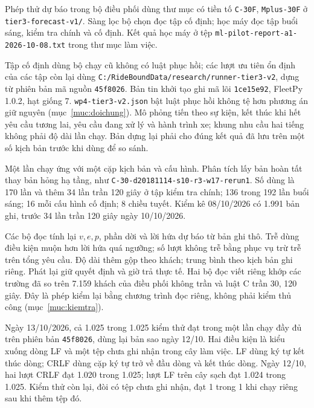 Phép thử dự báo trong bộ điều phối dùng thư mục có tiền tố \texttt{C-30F}, \texttt{Mplus-30F} ở \nolinkurl{tier3-forecast-v1/}. Sàng lọc bộ chọn đọc tập cố định; học máy đọc tập buổi sáng, kiểm tra chính và cố định. Kết quả học máy ở tệp \nolinkurl{ml-pilot-report-a1-2026-10-08.txt} trong thư mục làm việc.

Tập cố định dùng bộ chạy cũ không có luật phục hồi; các lượt ưu tiên ổn định của các tập còn lại dùng \nolinkurl{C:/RideBoundData/research/runner-tier3-v2}, dựng từ phiên bản mã nguồn \texttt{45f8026}. Bản tin khởi tạo ghi mã lõi \texttt{1ce15e92}, FleetPy 1.0.2, hạt giống 7. \nolinkurl{wp4-tier3-v2.json} bật luật phục hồi không tệ hơn phương án giữ nguyên (mục~\ref{muc:doichung}). Mô phỏng tiến theo sự kiện, kết thúc khi hết yêu cầu tương lai, yêu cầu đang xử lý và hành trình xe; khung nhu cầu hai tiếng không phải độ dài lần chạy. Bản dựng lại phải cho đúng kết quả đã lưu trên một số kịch bản trước khi dùng để so sánh.

Một lần chạy ứng với một cặp kịch bản và cấu hình. Phân tích lấy bản hoàn tất thay bản hỏng hạ tầng, như \nolinkurl{C-30-d20181114-s10-r3-w17-rerun1}. Số dùng là 170 lần và thêm 34 lần trần 120 giây ở tập kiểm tra chính; 136 trong 192 lần buổi sáng; 16 mỗi cấu hình cố định; 8 chiều tuyết. Kiểm kê 08/10/2026 có 1.991 bản ghi, trước 34 lần trần 120 giây ngày 10/10/2026.

Các bộ đọc tính lại $v,e,p$, phần dời và lời hứa dự báo từ bản ghi thô. Trễ dùng điều kiện muộn hơn lời hứa quá ngưỡng; số lượt không trễ bằng phục vụ trừ trễ trên tổng yêu cầu. Độ dài thêm gộp theo khách; trung bình theo kịch bản ghi riêng. Phát lại giữ quyết định và giờ trả thực tế. Hai bộ đọc viết riêng khớp các trường đã so trên 7.159 khách của điều phối không trần và luật C trần 30, 120 giây. Đây là phép kiểm lại bằng chương trình đọc riêng, không phải kiểm thủ công (mục~\ref{muc:kiemtra}).

Ngày 13/10/2026, cả 1.025 trong 1.025 kiểm thử đạt trong một lần chạy đầy đủ trên phiên bản \texttt{45f8026}, dùng lại bản sao ngày 12/10. Hai điều kiện là kiểu xuống dòng LF và một tệp chưa ghi nhận trong cây làm việc. LF dùng ký tự kết thúc dòng; CRLF dùng cặp ký tự trở về đầu dòng và kết thúc dòng. Ngày 12/10, hai lượt CRLF đạt 1.020 trong 1.025; lượt LF trên cây sạch đạt 1.024 trong 1.025. Kiểm thử còn lại, đòi có tệp chưa ghi nhận, đạt 1 trong 1 khi chạy riêng sau khi thêm tệp đó.


